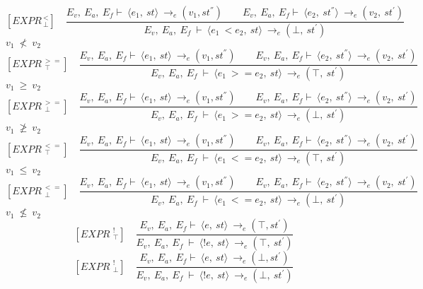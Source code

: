 	\[	
	[EXPR^{\ <}_{\ \bot}] \quad	
	\dfrac{E_v, \ E_a, \ E_f \vdash \ \langle e_1, \ st \rangle \ \rightarrow_e (v_1, st^{''}) \qquad E_v, \ E_a, \ E_f \vdash \ \langle e_2, \ st^{''} \rangle \ \rightarrow_e (v_2, \ st^{'})}{E_v, \ E_a, \ E_f \ \vdash \ \langle e_1 \ < e_2, \ st \rangle \ \rightarrow_e (\bot, \ st^{'})}	
	\]
	\begin{math}		
		v_1 \ \not< \ v_2		
	\end{math}
	\[	
	[EXPR^{\ >=}_{\ \ \top}] \quad	
	\dfrac{E_v, \ E_a, \ E_f \vdash \ \langle e_1, \ st \rangle \ \rightarrow_e (v_1, st^{''}) \qquad E_v, \ E_a, \ E_f \vdash \ \langle e_2, \ st^{''} \rangle \ \rightarrow_e (v_2, \ st^{'})}{E_v, \ E_a, \ E_f \ \vdash \ \langle e_1 \ >= e_2, \ st \rangle \ \rightarrow_e (\top, \ st^{'})}	
	\]
	\begin{math}		
		v_1 \ \ge \ v_2		
	\end{math} 
	\[	
	[EXPR^{\ >=}_{\ \ \bot}] \quad	
	\dfrac{E_v, \ E_a, \ E_f \vdash \ \langle e_1, \ st \rangle \ \rightarrow_e (v_1, st^{''}) \qquad E_v, \ E_a, \ E_f \vdash \ \langle e_2, \ st^{''} \rangle \ \rightarrow_e (v_2, \ st^{'})}{E_v, \ E_a, \ E_f \ \vdash \ \langle e_1 \ >= e_2, \ st \rangle \ \rightarrow_e (\bot, \ st^{'})}	
	\]
	\begin{math}		
		v_1 \ \ngeq \ v_2		
	\end{math}
	\[
	[EXPR^{\ <=}_{\ \ \top}] \quad
	\dfrac{E_v, \ E_a, \ E_f \vdash \ \langle e_1, \ st \rangle \ \rightarrow_e (v_1, st^{''}) \qquad E_v, \ E_a, \ E_f \vdash \ \langle e_2, \ st^{''} \rangle \ \rightarrow_e (v_2, \ st^{'})}{E_v, \ E_a, \ E_f \ \vdash \ \langle e_1 \ <= e_2, \ st \rangle \ \rightarrow_e (\top, \ st^{'})}
	\]
	\begin{math}		
		v_1 \ \le \ v_2		
	\end{math} 
	\[	
	[EXPR^{\ <=}_{\ \ \bot}] \quad	
	\dfrac{E_v, \ E_a, \ E_f \vdash \ \langle e_1, \ st \rangle \ \rightarrow_e (v_1, st^{''}) \qquad E_v, \ E_a, \ E_f \vdash \ \langle e_2, \ st^{''} \rangle \ \rightarrow_e (v_2, \ st^{'})}{E_v, \ E_a, \ E_f \ \vdash \ \langle e_1 \ <= e_2, \ st \rangle \ \rightarrow_e (\bot, \ st^{'})}	
	\]
	\begin{math}		
		v_1 \ \nleq \ v_2		
	\end{math}
	\[	
	[EXPR^{\ \ !}_{\ \ \top}] \quad	
	\dfrac{E_v, \ E_a, \ E_f \vdash \ \langle e, \ st \rangle \ \rightarrow_e (\top, st^{'})}{E_v, \ E_a, \ E_f \ \vdash \ \langle !e, \ st \rangle \ \rightarrow_e (\top, \ st^{'})}	
	\] \newline
	\[	
	[EXPR^{\ \ !}_{\ \ \bot}] \quad	
	\dfrac{E_v, \ E_a, \ E_f \vdash \ \langle e, \ st \rangle \ \rightarrow_e (\bot, st^{'})}{E_v, \ E_a, \ E_f \ \vdash \ \langle !e, \ st \rangle \ \rightarrow_e (\bot, \ st^{'})}	
	\]\newline
